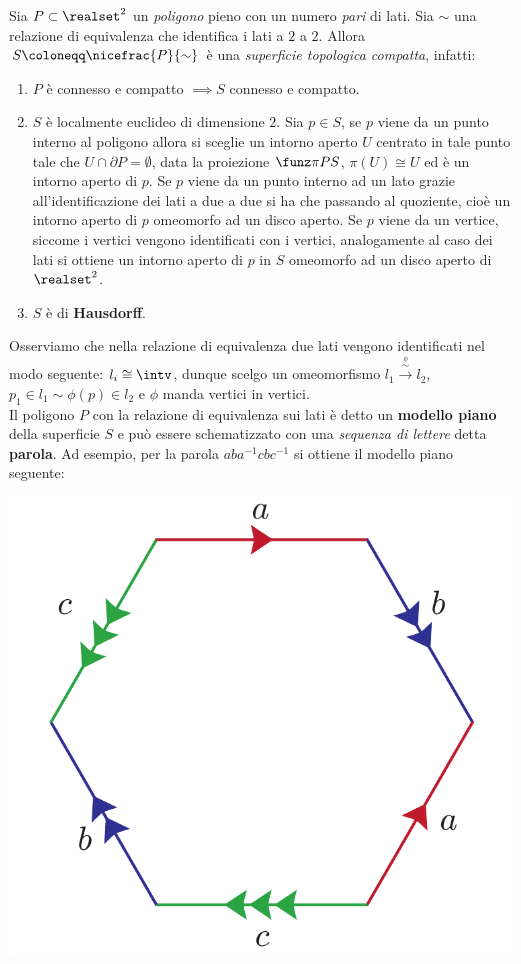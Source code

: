 \begin{observe}
	Sia $P\subset\realset^2$ un \textit{poligono} pieno con un numero \textit{pari} di lati. Sia $\sim$ una relazione di equivalenza che identifica i lati a $2$ a $2$. Allora $S\coloneqq\nicefrac{P}{\sim}$ è una \textit{superficie topologica compatta}, infatti:
		\begin{enumerate}
			\item  $P$ è connesso e compatto $\implies S$ connesso e compatto.
			\item $S$ è localmente euclideo di dimensione $2$. Sia $p\in S$, se $p$ viene da un punto interno al poligono allora si sceglie un intorno aperto $U$ centrato in tale punto tale che $U\cap\partial{P}=\emptyset$, data la proiezione $\funz \pi P S$, $\pi(U)\cong U$ ed è un intorno aperto di $p$. Se $p$ viene da un punto interno ad un lato grazie all'identificazione dei lati a due a due si ha che passando al quoziente, cioè un intorno aperto di $p$ omeomorfo ad un disco aperto. Se $p$ viene da un vertice, siccome i vertici vengono identificati con i vertici, analogamente al caso dei lati si ottiene un intorno aperto di $p$ in $S$ omeomorfo ad un disco aperto di $\realset^2$.
			\item $S$ è di \textbf{Hausdorff}.
		\end{enumerate}
	Osserviamo che nella relazione di equivalenza due lati vengono identificati nel modo seguente: $l_i\cong\intv$, dunque scelgo un omeomorfismo $l_1\stackrel{\stackrel{\phi}{\sim}}{\longrightarrow} l_2$, $p_1\in l_1 \sim \phi(p)\in l_2$ e $\phi$ manda vertici in vertici.\\
	Il poligono $P$ con la relazione di equivalenza sui lati è detto un \textbf{modello piano} della superficie $S$ e può essere schematizzato con una \textit{sequenza di lettere} detta \textbf{parola}. Ad esempio, per la parola $aba^{-1}cbc^{-1}$ si ottiene il modello piano seguente:
		\begin{center}
	\includegraphics[trim=0cm 0cm 0cm 0cm, clip, scale=0.375]{images/modellopiano.pdf}

\end{center}
\end{observe}
